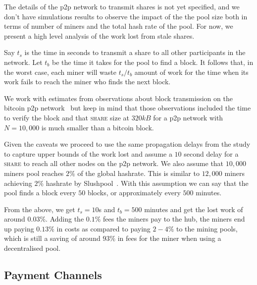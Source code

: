 \documentclass{article}
\begin{document}
The details of the p2p network to transmit shares is not yet
specified, and we don't have simulations results to observe the impact
of the the pool size both in terms of number of miners and the total
hash rate of the pool. For now, we present a high level analysis of
the work lost from stale shares.

Say $t_{s}$ is the time in seconds to transmit a share to all other
participants in the network.  Let $t_{b}$ be the time it takes for the
pool to find a block. It follows that, in the worst case, each miner
will waste $t_{s}/t_{b}$ amount of work for the time when its work
fails to reach the miner who finds the next block.

We work with estimates from observations about block transmission on
the bitcoin p2p network~\cite{information-propagation} but keep in
mind that those observations included the time to verify the block and
that \textsc{share} size at $320kB$ for a p2p network with
$N = 10,000$ is much smaller than a bitcoin block.

Given the caveats we proceed to use the same propagation delays from
the study to capture upper bounds of the work lost and assume a $10$
second delay for a \textsc{share} to reach all other nodes on the p2p
network. We also assume that $10,000$ miners pool reaches $2\%$ of the
global hashrate. This is similar to $12,000$ miners achieving $2\%$
hashrate by Slushpool~\cite{slushpool}. With this assumption we can
say that the pool finds a block every $50$ blocks, or approximately
every $500$ minutes.

From the above, we get $t_{s} = 10$s and $t_{b} = 500$ minutes and get
the lost work of around $0.03\%$. Adding the $0.1\%$ fees the miners
pay to the hub, the miners end up paying $0.13\%$ in costs as compared
to paying $2-4\%$ to the mining pools, which is still a saving of around
$93\%$ in fees for the miner when using a decentralised pool.



\subsection{Payment Channels}\label{ref:channels}
\end{document}
